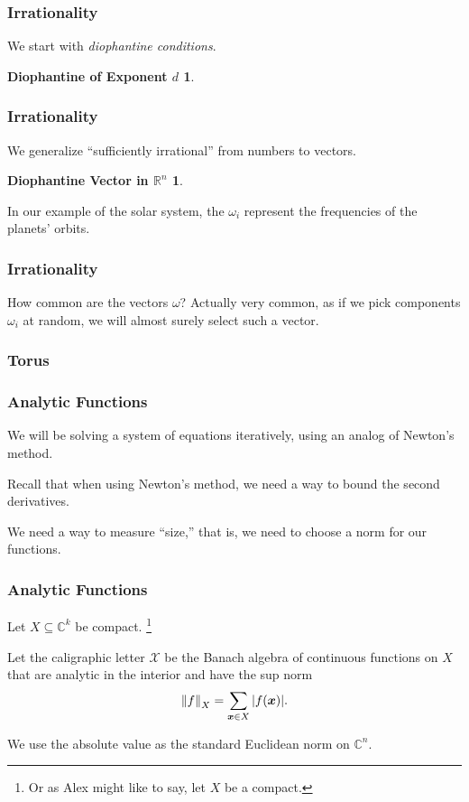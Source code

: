 \documentclass{beamer}
\newcommand{\C}{\mathbb{C}}
\newcommand{\bp}[1]{\bm{#1}}
\newcommand{\genericdel}[4]{%
  \ifcase#3\relax
  #1#4#2\or
  \bigl#1#4\bigr#2\or
  \Bigl#1#4\Bigr#2\or
  \biggl#1#4\biggr#2\or
  \Biggl#1#4\Biggr#2\else
  \left#1#4\right#2\fi
}
\newcommand{\enVert}[2][-1]{\genericdel\|\|{#1}{#2}}
\let\norm\enVert
\begin{document}
\begin{frame}
  \frametitle{Irrationality}
  We start with \emph{diophantine conditions}.
  \newtheorem{dionum}{Diophantine of Exponent $d$}
  \begin{dionum}
    \dionumber{}
  \end{dionum}
\end{frame}

\begin{frame}
  \frametitle{Irrationality}
  We generalize ``sufficiently irrational'' from numbers to vectors.
  \newtheorem{diovec}{Diophantine Vector in $\mathbb{R}^n$}
  \begin{diovec}
    \diovector{}
  \end{diovec}
  In our example of the solar system, the $\omega_i$ represent the
  frequencies of the planets' orbits.
\end{frame}

\begin{frame}
  \frametitle{Irrationality}
  How common are the vectors $\omega$?
  Actually very common, as if we pick components $\omega_i$ at random, we will
  almost surely select such a vector.
\end{frame}

\begin{frame}
  \frametitle{Torus}
\end{frame}

\begin{frame}
  \frametitle{Analytic Functions}

  We will be solving a system of equations iteratively, using an analog of
  Newton's method.
  
  Recall that when using Newton's method, we need a way to bound the second
  derivatives.
  
  We need a way to measure ``size,'' that is, we need to choose a norm for our
  functions.

\end{frame}

\begin{frame}
  \frametitle{Analytic Functions}
  Let $X \subseteq \C^k$ be compact.
  \footnote{ Or as Alex might like to say, let $X$ be a compact.}

  Let the caligraphic letter $\mathcal{X}$ be the Banach algebra of continuous
  functions on $X$ that are analytic in the interior and have the sup norm
  \begin{equation*}
    \norm{f}_X = \sum_{\bp{x} \in X} |f(\bp{x})|.
  \end{equation*}

  We use the absolute value as the standard Euclidean norm on $\C^n$.
\end{frame}
\end{document}
